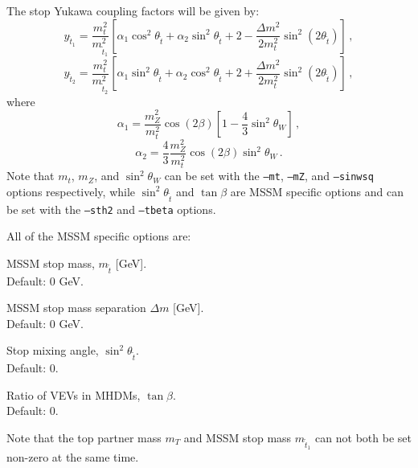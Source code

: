 \documentclass[12pt,a4wide]{article}
\begin{document}
The stop Yukawa coupling factors will be given by: 
\begin{equation}
   y_{\tilde{t}_1} = \frac{m_t^2}{m_{\tilde{t}_1}^2} \left [ \alpha_1 \cos^2 \theta_{\tilde{t}} + \alpha_2 \sin^2 \theta_{\tilde{t}} + 2 - \frac{\Delta m^2}{2 m_t^2} \sin^2\left ( 2 \theta_{\tilde{t}} \right ) \right ] \,,
\end{equation} 
\begin{equation}
   y_{\tilde{t}_2} = \frac{m_t^2}{m_{\tilde{t}_2}^2} \left [ \alpha_1 \sin^2 \theta_{\tilde{t}} + \alpha_2 \cos^2 \theta_{\tilde{t}} + 2 + \frac{\Delta m^2}{2 m_t^2} \sin^2\left ( 2 \theta_{\tilde{t}} \right ) \right ] \,, 
\end{equation} 
where 
\begin{equation}
   \alpha_1 = \frac{m_Z^2}{m_t^2} \cos \left ( 2 \beta \right ) \left [ 1 - \frac{4}{3} \sin^2\theta_W \right ] \,, 
\end{equation} 
\begin{equation}
   \alpha_2 = \frac{4}{3} \frac{m_Z^2}{m_t^2} \cos \left ( 2 \beta \right ) \sin^2\theta_W \,. 
\end{equation} 
Note that $m_t$, $m_Z$, and $\sin^2\theta_W$ can be set with the \texttt{--mt}, \texttt{--mZ}, and \texttt{--sinwsq} options respectively, while $\sin^2 \theta_{\tilde{t}}$ and $\tan\beta$ are MSSM specific options and can be set with the \texttt{--sth2} and \texttt{--tbeta} options. 

All of the MSSM specific options are: 
\begin{description}[labelindent=\parindent, labelwidth =\widthof{\bfseries9999999999999999999999}, leftmargin = !] 
	\item[\texttt{--mst <value>}] MSSM stop mass, $m_{\tilde{t}}$ [GeV]. \\ Default: 0 GeV. 
	\item[\texttt{--delta <value>}] MSSM stop mass separation $\Delta m$ [GeV]. \\ Default: 0 GeV. 
	\item[\texttt{--sth2 <value>}] Stop mixing angle, $\sin^2 \theta_{\tilde{t}}$. \\ Default: 0. 
	\item[\texttt{--tbeta <value>}] Ratio of VEVs in MHDMs, $\tan\beta$. \\ Default: 0. 
\end{description}
Note that the top partner mass $m_{T}$ and MSSM stop mass $m_{\tilde{t}_1}$ can not both be set non-zero at the same time. 
\end{document}
